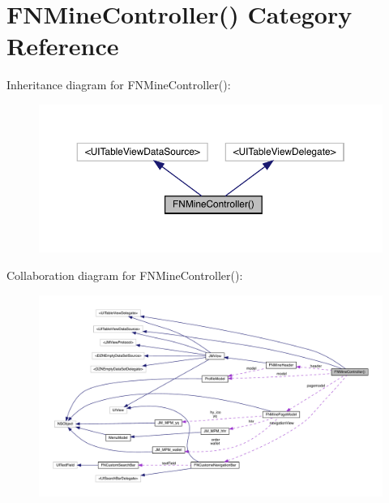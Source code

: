 \hypertarget{category_f_n_mine_controller_07_08}{}\section{F\+N\+Mine\+Controller() Category Reference}
\label{category_f_n_mine_controller_07_08}


Inheritance diagram for F\+N\+Mine\+Controller()\+:\nopagebreak
\begin{figure}[H]
\begin{center}
\leavevmode
\includegraphics[width=350pt]{category_f_n_mine_controller_07_08__inherit__graph}
\end{center}
\end{figure}


Collaboration diagram for F\+N\+Mine\+Controller()\+:\nopagebreak
\begin{figure}[H]
\begin{center}
\leavevmode
\includegraphics[width=350pt]{category_f_n_mine_controller_07_08__coll__graph}
\end{center}
\end{figure}

